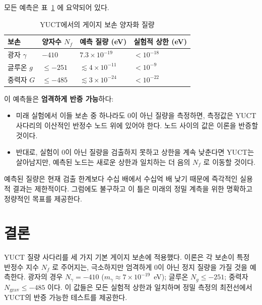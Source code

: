 \documentclass[11pt,a4paper]{article}
\begin{document}
	모든 예측은 표~\ref{tab:predictions} 에 요약되어 있다.
	
	\begin{table}[H]
		\centering
		\footnotesize
		\caption{YUCT에서의 게이지 보손 양자화 질량}
		\label{tab:predictions}
		\begin{tabular}{p{3cm}p{3cm}p{3cm}p{3cm}}
			\toprule
			\textbf{보손} & \textbf{양자수 $N_f$} & \textbf{예측 질량 (eV)} & \textbf{실험적 상한 (eV)} \\
			\midrule
			광자   $\gamma$ & $-410$ & $7.3 \times 10^{-19}$ & $< 10^{-18}$ \\
			글루온 $g$ & $\le -251$ & $\lesssim 4 \times 10^{-11}$ & $< 10^{-9}$ \\
			중력자 $G$ & $\le -485$ & $\lesssim 3 \times 10^{-24}$ & $< 10^{-22}$ \\
			\bottomrule
		\end{tabular}
	\end{table}
	
	이 예측들은 \textbf{엄격하게 반증 가능}하다:
	\begin{itemize}
		\item 미래 실험에서 이들 보손 중 하나라도 0이 아닌 질량을 측정하면, 측정값은 YUCT 사다리의 이산적인 반정수 노드 위에 있어야 한다. 노드 사이의 값은 이론을 반증할 것이다.
		\item 반대로, 실험이 0이 아닌 질량을 검출하지 못하고 상한을 계속 낮춘다면 YUCT는 살아남지만, 예측된 노드는 새로운 상한과 일치하는 더 음의 $N_f$ 로 이동할 것이다.
	\end{itemize}
	
	예측된 질량은 현재 검출 한계보다 수십 배에서 수십억 배 낮기 때문에 즉각적인 실용적 결과는 제한적이다. 그럼에도 불구하고 이 틀은 미래의 정밀 계측을 위한 명확하고 정량적인 목표를 제공한다.
	
	\section{결론}
	
	YUCT 질량 사다리를 세 가지 기본 게이지 보손에 적용했다. 이론은 각 보손이 특정 반정수 지수 $N_f$ 로 주어지는, 극소하지만 엄격하게 0이 아닌 정지 질량을 가질 것을 예측한다. 광자의 경우 $N_\gamma = -410$ ($m_\gamma \approx 7\times 10^{-19}$~eV); 글루온 $N_g \le -251$; 중력자 $N_{\mathrm{grav}} \le -485$ 이다. 이 값들은 모든 실험적 상한과 일치하며 정밀 측정의 최전선에서 YUCT의 반증 가능한 테스트를 제공한다.
	
\end{document}
